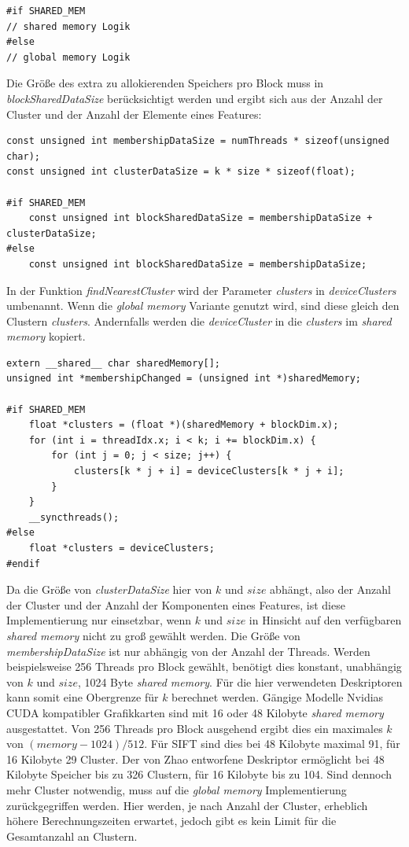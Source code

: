 \lstset{language=C}
\begin{lstlisting}
#if SHARED_MEM
// shared memory Logik
#else
// global memory Logik
\end{lstlisting}

Die Größe des extra zu allokierenden Speichers pro Block muss in \textit{blockSharedDataSize} berücksichtigt werden und ergibt sich aus der Anzahl der Cluster und der Anzahl der Elemente eines Features:

\lstset{language=C}
\begin{lstlisting}
const unsigned int membershipDataSize = numThreads * sizeof(unsigned char);
const unsigned int clusterDataSize = k * size * sizeof(float);

#if SHARED_MEM
    const unsigned int blockSharedDataSize = membershipDataSize + clusterDataSize;
#else
	const unsigned int blockSharedDataSize = membershipDataSize;
\end{lstlisting}

In der Funktion \textit{findNearestCluster} wird der Parameter \textit{clusters} in \textit{deviceClusters} umbenannt. Wenn die \textit{global memory} Variante genutzt wird, sind diese gleich den Clustern \textit{clusters}. Andernfalls werden die \textit{deviceCluster} in die \textit{clusters} im \textit{shared memory} kopiert.

\lstset{language=C}
\begin{lstlisting}
extern __shared__ char sharedMemory[];
unsigned int *membershipChanged = (unsigned int *)sharedMemory;
    
#if SHARED_MEM
    float *clusters = (float *)(sharedMemory + blockDim.x);
	for (int i = threadIdx.x; i < k; i += blockDim.x) {
  		for (int j = 0; j < size; j++) {
    		clusters[k * j + i] = deviceClusters[k * j + i];
  		}
	}
	__syncthreads();
#else
    float *clusters = deviceClusters;
#endif
\end{lstlisting}

Da die Größe von \textit{clusterDataSize} hier von $k$ und $size$ abhängt, also der Anzahl der Cluster und der Anzahl der Komponenten eines Features, ist diese Implementierung nur einsetzbar, wenn $k$ und $size$ in Hinsicht auf den verfügbaren \textit{shared memory} nicht zu groß gewählt werden. Die Größe von \textit{membershipDataSize} ist nur abhängig von der Anzahl der Threads. Werden beispielsweise 256 Threads pro Block gewählt, benötigt dies konstant, unabhängig von $k$ und $size$, 1024 Byte \textit{shared memory}. Für die hier verwendeten Deskriptoren kann somit eine Obergrenze für $k$ berechnet werden. Gängige Modelle Nvidias CUDA kompatibler Grafikkarten sind mit 16 oder 48 Kilobyte \textit{shared memory} ausgestattet. Von 256 Threads pro Block ausgehend ergibt dies ein maximales $k$ von $(memory - 1024) / 512$. Für SIFT sind dies bei 48 Kilobyte maximal 91, für 16 Kilobyte 29 Cluster. Der von Zhao entworfene Deskriptor ermöglicht bei 48 Kilobyte Speicher bis zu 326 Clustern, für 16 Kilobyte bis zu 104. Sind dennoch mehr Cluster notwendig, muss auf die \textit{global memory} Implementierung zurückgegriffen werden. Hier werden, je nach Anzahl der Cluster, erheblich höhere Berechnungszeiten erwartet, jedoch gibt es kein Limit für die Gesamtanzahl an Clustern.